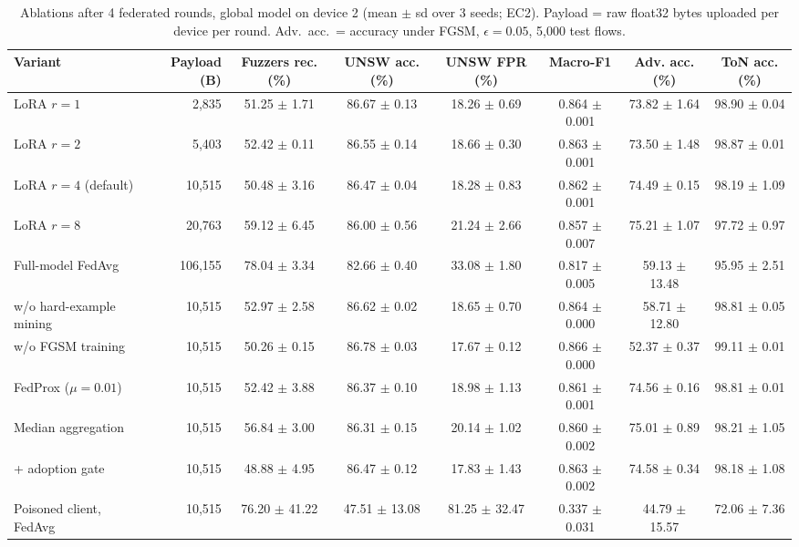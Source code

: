 \begin{table}[t]\centering
\caption{Ablations after 4 federated rounds, global model on device 2 (mean $\pm$ sd over 3 seeds; EC2). Payload = raw float32 bytes uploaded per device per round. Adv.\ acc.\ = accuracy under FGSM, $\epsilon{=}0.05$, 5{,}000 test flows.}
\label{tab:ablation}
\begin{tabular}{lrcccccc}\toprule
Variant & Payload (B) & Fuzzers rec. (\%) & UNSW acc. (\%) & UNSW FPR (\%) & Macro-F1 & Adv. acc. (\%) & ToN acc. (\%) \\ \midrule
LoRA $r{=}1$ & 2,835 & 51.25 $\pm$ 1.71 & 86.67 $\pm$ 0.13 & 18.26 $\pm$ 0.69 & 0.864 $\pm$ 0.001 & 73.82 $\pm$ 1.64 & 98.90 $\pm$ 0.04 \\
LoRA $r{=}2$ & 5,403 & 52.42 $\pm$ 0.11 & 86.55 $\pm$ 0.14 & 18.66 $\pm$ 0.30 & 0.863 $\pm$ 0.001 & 73.50 $\pm$ 1.48 & 98.87 $\pm$ 0.01 \\
LoRA $r{=}4$ (default) & 10,515 & 50.48 $\pm$ 3.16 & 86.47 $\pm$ 0.04 & 18.28 $\pm$ 0.83 & 0.862 $\pm$ 0.001 & 74.49 $\pm$ 0.15 & 98.19 $\pm$ 1.09 \\
LoRA $r{=}8$ & 20,763 & 59.12 $\pm$ 6.45 & 86.00 $\pm$ 0.56 & 21.24 $\pm$ 2.66 & 0.857 $\pm$ 0.007 & 75.21 $\pm$ 1.07 & 97.72 $\pm$ 0.97 \\
Full-model FedAvg & 106,155 & 78.04 $\pm$ 3.34 & 82.66 $\pm$ 0.40 & 33.08 $\pm$ 1.80 & 0.817 $\pm$ 0.005 & 59.13 $\pm$ 13.48 & 95.95 $\pm$ 2.51 \\
w/o hard-example mining & 10,515 & 52.97 $\pm$ 2.58 & 86.62 $\pm$ 0.02 & 18.65 $\pm$ 0.70 & 0.864 $\pm$ 0.000 & 58.71 $\pm$ 12.80 & 98.81 $\pm$ 0.05 \\
w/o FGSM training & 10,515 & 50.26 $\pm$ 0.15 & 86.78 $\pm$ 0.03 & 17.67 $\pm$ 0.12 & 0.866 $\pm$ 0.000 & 52.37 $\pm$ 0.37 & 99.11 $\pm$ 0.01 \\
FedProx ($\mu{=}0.01$) & 10,515 & 52.42 $\pm$ 3.88 & 86.37 $\pm$ 0.10 & 18.98 $\pm$ 1.13 & 0.861 $\pm$ 0.001 & 74.56 $\pm$ 0.16 & 98.81 $\pm$ 0.01 \\
Median aggregation & 10,515 & 56.84 $\pm$ 3.00 & 86.31 $\pm$ 0.15 & 20.14 $\pm$ 1.02 & 0.860 $\pm$ 0.002 & 75.01 $\pm$ 0.89 & 98.21 $\pm$ 1.05 \\
+ adoption gate & 10,515 & 48.88 $\pm$ 4.95 & 86.47 $\pm$ 0.12 & 17.83 $\pm$ 1.43 & 0.863 $\pm$ 0.002 & 74.58 $\pm$ 0.34 & 98.18 $\pm$ 1.08 \\
Poisoned client, FedAvg & 10,515 & 76.20 $\pm$ 41.22 & 47.51 $\pm$ 13.08 & 81.25 $\pm$ 32.47 & 0.337 $\pm$ 0.031 & 44.79 $\pm$ 15.57 & 72.06 $\pm$ 7.36 \\

\end{tabular}
\end{table}
